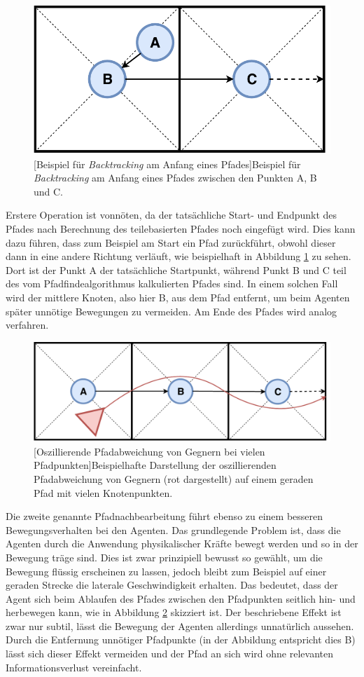 \begin{figure}[h]
 \centering
 \includegraphics[width=0.4\linewidth]{pics/Backtracking_Example.pdf}
 [Beispiel für \textit{Backtracking} am Anfang eines Pfades]{Beispiel für \textit{Backtracking} am Anfang eines Pfades zwischen den Punkten A, B und C.}
	\label{fig:backtrackingPath}
\end{figure}

Erstere Operation ist vonnöten, da der tatsächliche Start- und Endpunkt des Pfades nach Berechnung des teilebasierten Pfades noch eingefügt wird. Dies kann dazu führen, dass zum Beispiel am Start ein Pfad zurückführt, obwohl dieser dann in eine andere Richtung verläuft, wie beispielhaft in Abbildung \ref{fig:backtrackingPath} zu sehen. Dort ist der Punkt A der tatsächliche Startpunkt, während Punkt B und C teil des vom Pfadfindealgorithmus kalkulierten Pfades sind. In einem solchen Fall wird der mittlere Knoten, also hier B, aus dem Pfad entfernt, um beim Agenten später unnötige Bewegungen zu vermeiden. Am Ende des Pfades wird analog verfahren.

\begin{figure}[h]
 \centering
 \includegraphics[width=0.6\linewidth]{pics/Enemy_Path_Oscillation.pdf}
 [Oszillierende Pfadabweichung von Gegnern bei vielen Pfadpunkten]{Beispielhafte Darstellung der oszillierenden Pfadabweichung von Gegnern (rot dargestellt) auf einem geraden Pfad mit vielen Knotenpunkten.}
	\label{fig:enemyOscillation}
\end{figure}

Die zweite genannte Pfadnachbearbeitung führt ebenso zu einem besseren Bewegungsverhalten bei den Agenten. Das grundlegende Problem ist, dass die Agenten durch die Anwendung physikalischer Kräfte bewegt werden und so in der Bewegung träge sind. Dies ist zwar prinzipiell bewusst so gewählt, um die Bewegung flüssig erscheinen zu lassen, jedoch bleibt zum Beispiel auf einer geraden Strecke die laterale Geschwindigkeit erhalten. Das bedeutet, dass der Agent sich beim Ablaufen des Pfades zwischen den Pfadpunkten seitlich hin- und herbewegen kann, wie in Abbildung \ref{fig:enemyOscillation} skizziert ist. Der beschriebene Effekt ist zwar nur subtil, lässt die Bewegung der Agenten allerdings unnatürlich aussehen. Durch die Entfernung unnötiger Pfadpunkte (in der Abbildung entspricht dies B) lässt sich dieser Effekt vermeiden und der Pfad an sich wird ohne relevanten Informationsverlust vereinfacht.

